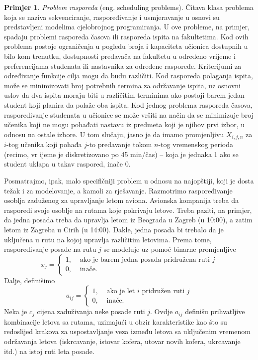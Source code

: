 \documentclass[b5paper, utf8, 11pt, colorlinks]{book}
\theoremstyle{definition}
\newtheorem{primjer}{Primjer}[chapter]
\begin{document}
\begin{primjer}
	\emph{Problem rasporeda} (eng. scheduling problems). Čitava klasa problema koja se naziva sekvenciranje, raspoređivanje i usmjeravanje u osnovi su predstavljeni modelima cjelobrojnog programiranja. U ove probleme, na primjer, spadaju problemi rasporeda časova ili rasporeda ispita na fakultetima. Kod ovih problema postoje ograničenja u pogledu broja i kapaciteta učionica dostupnih u bilo kom trenutku, dostupnosti predavača na fakultetu u određeno vrijeme i preferencijama studenata ili nastavnika za određene rasporede. Kriterijumi za određivanje funkcije cilja mogu da budu različiti. Kod rasporeda polaganja ispita, može se minimizovati broj potrebnih termina za održavanje ispita, uz osnovni uslov da dva ispita moraju biti u različitim terminima ako postoji barem jedan student koji planira da polaže oba ispita.  Kod jednog problema rasporeda časova, raspoređivanje studenata u  učionice se može vršiti na  način da se minimizuje broj učenika koji ne mogu pohađati nastavu iz predmeta koji je njihov prvi izbor, u odnosu na ostale izbore.
	U tom slučaju, jasno je da imamo promjenljivu $X_{i,j,n}$ za   $i$-tog učenika 
	koji pohađa $j$-to predavanje tokom $n$-tog vremenskog perioda (recimo, vr	ijeme je diskretizovano po 45 min/čas) -- koja je jednaka 1 ako se student uklapa u takav raspored, inače 0. 
\end{primjer}
Posmatrajmo, ipak, malo specifičniji problem u odnosu na najopštiji, koji je dosta težak i za modelovanje, a kamoli za rješavanje. 
Razmotrimo raspoređivanje osoblja zaduženog za upravljanje letom aviona. 
Avionska kompanija treba da rasporedi svoje osoblje na rutama koje pokrivaju letove. Treba paziti, na primjer, da jedna posada treba da upravlja letom iz  Beograda u Zagreb (u 10:00), a zatim letom iz Zagreba u Cirih (u 14:00). Dakle, jedna posada bi trebalo da je uključena u rutu na kojoj upravlja različitim letovima. Prema tome, raspoređivanje posade na rutu $j$ se modeluje uz pomoć binarne promjenljive 
$$x_j = \begin{cases}
	1,& \mbox{ ako je barem jedna posada pridružena ruti } j \\
	0,& \mbox{ inače}. 
\end{cases}
$$
Dalje, definišimo 
$$a_{ij}= \begin{cases}
	1,& \mbox{ ako je let } i \mbox{ pridružen ruti } j \\
	0,& \mbox{ inače}.
\end{cases}
$$
Neka je $c_j$ cijena zaduživanja neke posade ruti $j$. Ovdje $a_{ij}$ definišu prihvatljive kombinacije letova sa rutama, uzimajući u obzir  karakteristike kao što su redoslijed krakova za uspostavljanje veza između letova sa uključenim vremenom  održavanja letova (iskrcavanje, istovar  kofera, utovar   novih kofera, ukrcavanje itd.) na istoj ruti leta posade.   
\end{document}
